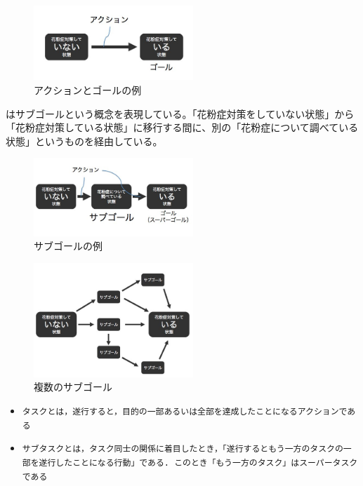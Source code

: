 \documentclass[submit,techreq]{ipsj}
\def\|{\verb|}
\begin{document}
\begin{figure}[tb]
\includegraphics[width=6cm, bb=0 0 350 300]{action_goal.jpg}
\caption{アクションとゴールの例}
\label{fig:action_goal}
\end{figure}

はサブゴールという概念を表現している。「花粉症対策をしていない状態」から「花粉症対策している状態」に移行する間に、別の「花粉症について調べている状態」というものを経由している。


\begin{figure}[tb]
\includegraphics[width=6cm, bb=0 0 450 300]{sub_goal.jpg}
\caption{サブゴールの例}
\label{fig:sub_goal}
\end{figure}



\begin{figure}[tb]
\includegraphics[width=6cm, bb=0 0 450 300]{many_sub_goals.jpg}
\caption{複数のサブゴール}
\label{fig:many_sub_goals}
\end{figure}

\begin{itemize}

\item \|タスクとは，遂行すると，目的の一部あるいは全部を達成したことになるアクションである|
\item \|サブタスクとは，タスク同士の関係に着目したとき，「遂行するともう一方のタスクの一部を遂行したことになる行動」である. このとき「もう一方のタスク」はスーパータスクである|
\end{itemize}
\end{document}

